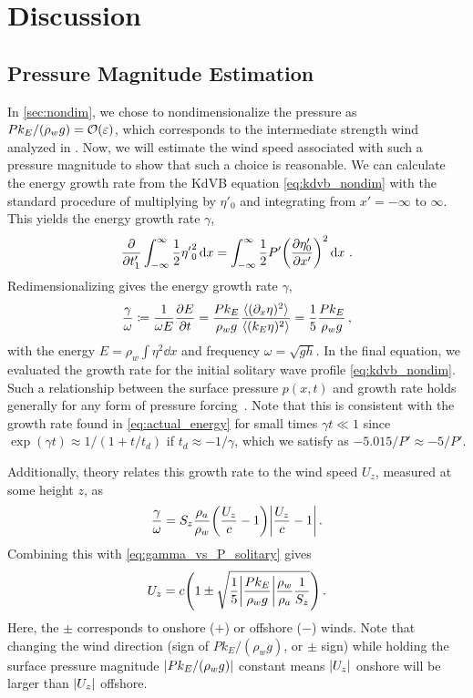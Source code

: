\documentclass{jfm}
\renewcommand*{\epsilon}{\varepsilon}
\begin{document}
\section{Discussion}

\subsection{\label{sec:press_mag} Pressure Magnitude Estimation}
In \cref{sec:nondim}, we chose to nondimensionalize the pressure as
$P k_E/(\rho_w g) = \order{\epsilon}$, which corresponds to the
intermediate strength wind analyzed in \citet{zdyrski2020wind}.
Now, we will estimate the wind speed associated with such a pressure
magnitude to show that such a choice is reasonable.
We can calculate the energy growth rate from the KdVB equation
\cref{eq:kdvb_nondim} with the standard procedure
\citep[\eg][]{mei2005nonlinear} of multiplying by $\eta'_0$ and
integrating from $x'=-\infty$ to $\infty$.
This yields the energy growth rate $\gamma$,
\begin{equation}
  \pdv{t'_1} \int_{-\infty}^{\infty} \frac{1}{2} {\eta'}_0^2 \dd{x}
  = \int_{-\infty}^{\infty} \frac{1}{2} P' \pqty{\pdv{\eta'_0}{x'}}^2
  \dd{x} \,.
\end{equation}
Redimensionalizing gives the energy growth rate $\gamma$,
\begin{equation}
  \frac{\gamma}{\omega} \coloneqq
  \frac{1}{\omega E} \pdv{E}{t}
  = \frac{P k_E}{\rho_w g} \frac{\langle (\partial_x \eta)^2 \rangle}
    {\langle (k_E \eta)^2 \rangle}
  = \frac{1}{5} \frac{P k_E}{\rho_w g}
  \,,
  \label{eq:gamma_vs_P_solitary}
\end{equation}
with the energy $E = \rho_w \int \eta^2 \dd{x}$ and frequency $\omega =
\sqrt{gh}$.
In the final equation, we evaluated the growth rate for the initial
solitary wave profile \cref{eq:kdvb_nondim}.
Such a relationship between the surface pressure $p(x,t)$ and growth
rate holds generally for any form of pressure
forcing~\citep[\eg][]{peirson2008wind}.
Note that this is consistent with the growth rate found in
\cref{eq:actual_energy} for small times $\gamma t \ll 1$ since
$\exp(\gamma t) \approx 1/(1+t/t_d)$ if $t_d \approx -1/\gamma$, which
we satisfy as $-5.015/P' \approx -5/P'$.

Additionally, \citet{jeffreys1925formation} theory relates this growth
rate to the wind speed $U_z$, measured at some height $z$, as
\begin{equation}
  \frac{\gamma}{\omega} = S_z \frac{\rho_a}{\rho_w}
    \pqty{\frac{U_z}{c}-1} \abs{\frac{U_z}{c}-1} \,.
  \label{eq:gamma_vs_u_jeffreys}
\end{equation}
Combining this with \cref{eq:gamma_vs_P_solitary} gives
\begin{equation}
  U_z = c \pqty{1 \pm \sqrt{\frac{1}{5} \abs{\frac{P k_E}{\rho_w g}}
    \frac{\rho_w}{\rho_a} \frac{1}{S_z}}} \,.
\end{equation}
Here, the $\pm$ corresponds to onshore ($+$) or offshore ($-$) winds.
Note that changing the wind direction (\ie sign of $Pk_E/(\rho_w g)$, or
$\pm$ sign) while holding the surface pressure magnitude
$\abs{Pk_E/(\rho_w g)}$ constant means $\abs{U_z}$ onshore will be
larger than $\abs{U_z}$ offshore.
\end{document}
